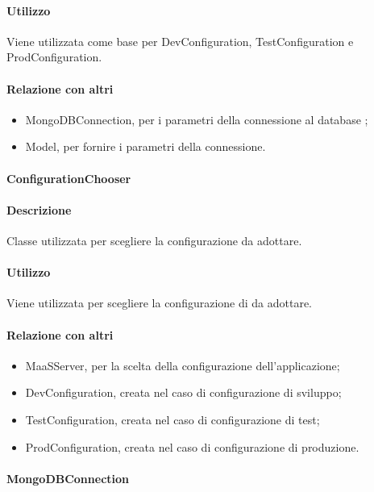 \paragraph*{Utilizzo}
Viene utilizzata come base per DevConfiguration, TestConfiguration e ProdConfiguration.

\paragraph*{Relazione con altri }
\begin{itemize}
\item MongoDBConnection, per i parametri della connessione al database ;
\item Model, per fornire i parametri della connessione.
\end{itemize}

\paragraph{ConfigurationChooser}
\paragraph*{Descrizione}
Classe utilizzata per scegliere la configurazione da adottare.

\paragraph*{Utilizzo}
Viene utilizzata per scegliere la configurazione di  da adottare.

\paragraph*{Relazione con altri }
\begin{itemize}
\item MaaSServer, per la scelta della configurazione dell'applicazione;
\item DevConfiguration, creata nel caso di configurazione di sviluppo;
\item TestConfiguration, creata nel caso di configurazione di test;
\item ProdConfiguration, creata nel caso di configurazione di produzione.
\end{itemize}

\paragraph{MongoDBConnection}
